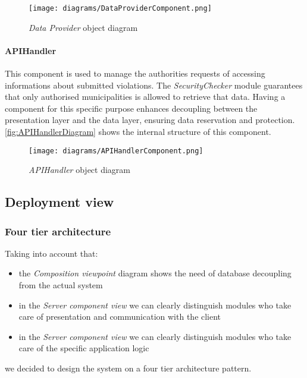 \begin{figure}[h!]
	\centering
	\texttt{[image: diagrams/DataProviderComponent.png]}
	\caption{
		\label{fig:dataProviderComponentDiagram} 
		\emph{Data Provider} object diagram
	}
\end{figure}

\clearpage

\paragraph{APIHandler}
This component is used to manage the authorities requests of accessing informations about submitted violations. The \textit{SecurityChecker} module guarantees that only authorised municipalities is allowed to retrieve that data. Having a component for this specific purpose enhances decoupling between the presentation layer and the data layer, ensuring data reservation and protection. \autoref{fig:APIHandlerDiagram} shows the internal structure of this component.\newline\newline
\begin{figure}[h!]
	\centering
	\texttt{[image: diagrams/APIHandlerComponent.png]}
	\caption{
		\label{fig:APIHandlerDiagram} 
		\emph{APIHandler} object diagram
	}
\end{figure}

\clearpage

\subsection{Deployment view}

\subsubsection{Four tier architecture}
Taking into account that:
\begin{itemize}
	\item the \emph{Composition viewpoint} diagram shows the need of database decoupling from the actual system
	\item in the \emph{Server component view} we can clearly distinguish modules who take care of presentation and communication with the client
	\item in the \emph{Server component view} we can clearly distinguish modules who take care of the specific application logic
\end{itemize}
we decided to design the system on a four tier architecture pattern.\newline\newline

